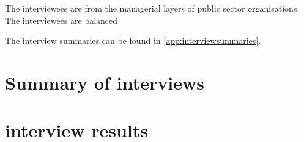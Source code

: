 The interviewees are from the managerial layers of public sector organisations. The interviewees are balanced
\begin{table}[!h]
	\centering
	\caption[Interviewees]{Interviewees}%
	\label{tab:Interviewees}%
\end{table}

The interview summaries can be found in \cref{app:interviewsummaries}.

\section{Summary of interviews}

\section{interview results}
